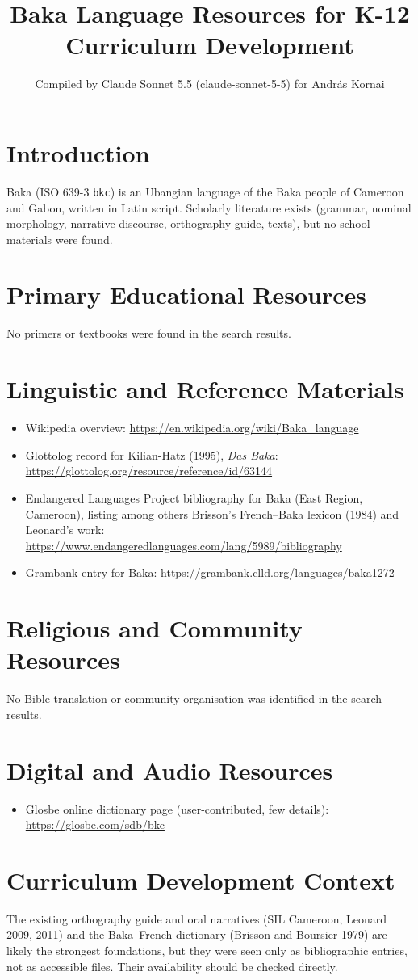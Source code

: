 \documentclass[12pt]{article}
\title{Baka Language Resources for K-12 Curriculum Development}
\author{Compiled by Claude Sonnet 5.5 (claude-sonnet-5-5) for Andr\'as Kornai}
\date{}
\begin{document}
\maketitle

\section{Introduction}
Baka (ISO 639-3 \texttt{bkc}) is an Ubangian language of the Baka people of Cameroon and Gabon, written in Latin script. Scholarly literature exists (grammar, nominal morphology, narrative discourse, orthography guide, texts), but no school materials were found.

\section{Primary Educational Resources}
No primers or textbooks were found in the search results.

\section{Linguistic and Reference Materials}
\begin{itemize}
\item Wikipedia overview: \url{https://en.wikipedia.org/wiki/Baka_language}
\item Glottolog record for Kilian-Hatz (1995), \emph{Das Baka}: \url{https://glottolog.org/resource/reference/id/63144}
\item Endangered Languages Project bibliography for Baka (East Region, Cameroon), listing among others Brisson's French--Baka lexicon (1984) and Leonard's work: \url{https://www.endangeredlanguages.com/lang/5989/bibliography}
\item Grambank entry for Baka: \url{https://grambank.clld.org/languages/baka1272}
\end{itemize}

\section{Religious and Community Resources}
No Bible translation or community organisation was identified in the search results.

\section{Digital and Audio Resources}
\begin{itemize}
\item Glosbe online dictionary page (user-contributed, few details): \url{https://glosbe.com/sdb/bkc}
\end{itemize}

\section{Curriculum Development Context}
The existing orthography guide and oral narratives (SIL Cameroon, Leonard 2009, 2011) and the Baka--French dictionary (Brisson and Boursier 1979) are likely the strongest foundations, but they were seen only as bibliographic entries, not as accessible files. Their availability should be checked directly.
\end{document}
